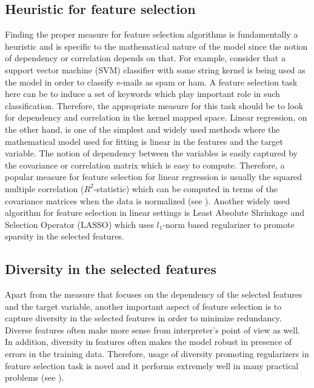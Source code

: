 \subsection{Heuristic for feature selection}
Finding the proper measure for feature selection algorithms is fundamentally a heuristic and is specific to the mathematical nature of the model since the notion of dependency or correlation depends on that. For example, consider that a support vector machine (SVM) classifier with some string kernel is being used as the model in order to classify e-mails as spam or ham. A feature selection task here can be to induce a set of keywords which play important role in such classification. Therefore, the appropriate measure for this task should be to look for dependency and correlation in the kernel mapped space. Linear regression, on the other hand, is one of the simplest and widely used methods where the mathematical model used for fitting is linear in the features and the target variable. The notion of dependency between the variables is easily captured by the covariance or correlation matrix which is easy to compute. Therefore, a popular measure for feature selection for linear regression is usually the squared multiple correlation ($R^2$-statistic) which can be computed in terms of the covariance matrices when the data is normalized (see \citealp{Das:2008:ASS:1374376.1374384}). Another widely used algorithm for feature selection in linear settings is Least Absolute Shrinkage and Selection Operator (LASSO) which uses $l_1$-norm based regularizer to promote sparsity in the selected features.

\subsection{Diversity in the selected features}
Apart from the measure that focuses on the dependency of the selected features and the target variable, another important aspect of feature selection is to capture diversity in the selected features in order to minimize redundancy. Diverse features often make more sense from interpreter's point of view as well. In addition, diversity in features often makes the model robust in presence of errors in the training data. Therefore, usage of diversity promoting regularizers in feature selection task is novel and it performs extremely well in many practical problems (see \citealp{NIPS2012_4689}).

